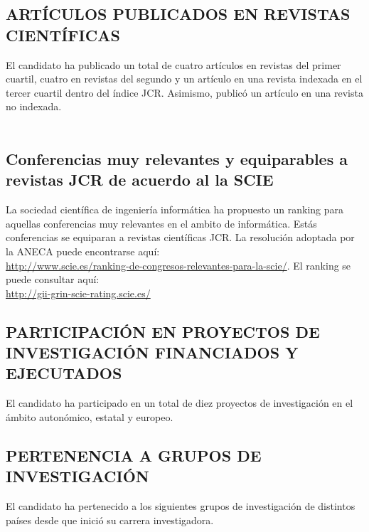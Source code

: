 \subsection{ARTÍCULOS PUBLICADOS EN REVISTAS CIENTÍFICAS}
El candidato ha publicado un total de cuatro artículos en revistas del primer cuartil, cuatro en revistas del segundo y un artículo en una revista indexada en el tercer cuartil dentro del índice JCR. Asimismo, publicó un artículo en una revista no indexada. \\
\startitems
{}
\stopitems 
\newpage
~
\newpage

\addtocounter{subsection}{-1}
\subsection{Conferencias muy relevantes y equiparables a revistas JCR de acuerdo al la SCIE} 
La sociedad científica de ingeniería informática ha propuesto un ranking para aquellas 
conferencias muy relevantes en el ambito de informática. Estás conferencias se equiparan a revistas científicas JCR. 
La resolución adoptada por la ANECA puede encontrarse aquí: \\
\url{http://www.scie.es/ranking-de-congresos-relevantes-para-la-scie/}.
El ranking se puede consultar aquí:\\
\url{http://gii-grin-scie-rating.scie.es/}

\startitems
{} 
\stopitems



\subsection{PARTICIPACIÓN EN PROYECTOS DE INVESTIGACIÓN FINANCIADOS Y EJECUTADOS}
\label{sec:motiv}
\label{sec:cybersecurity}
\label{sec:cyberdefense}

El candidato ha participado en un total de diez proyectos de investigación en el ámbito autonómico, estatal y europeo. \\
\startitems
\printProjects 
\stopitems

\subsection{PERTENENCIA A GRUPOS DE INVESTIGACIÓN}
El candidato ha pertenecido a los siguientes grupos de investigación de distintos países desde que inició su carrera investigadora. \\
\startitems
\printGroups 
\stopitems
 
